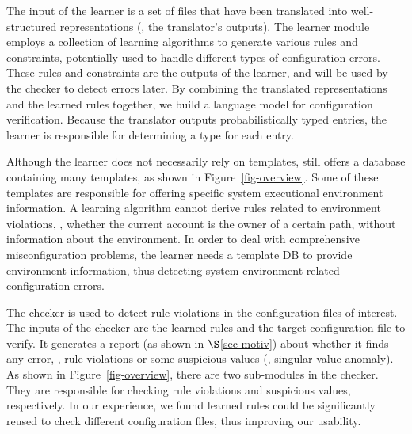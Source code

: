 The input of the learner is a set of files that have been translated
into well-structured representations (\ie, the translator's
outputs). The learner module employs a collection of learning algorithms
to generate various rules and constraints,
potentially used to handle different types of configuration errors.
These rules and constraints are the outputs of the learner, 
and will be used by the checker to detect errors later.
By combining the translated representations and the learned
rules together, we build a language model for
configuration verification.
Because the translator outputs probabilistically typed entries,
the learner is responsible for determining a type for each entry.


Although the learner does not necessarily rely on templates,
\app still offers a database containing many templates,
as shown in Figure~\ref{fig-overview}.
Some of these templates are responsible for offering
specific system executional environment information.
A learning algorithm cannot derive rules 
related to environment violations, \eg,
whether the current account is 
the owner of a certain path, without information 
about the environment. 
In order to deal with comprehensive misconfiguration problems,
the learner needs a template DB to provide environment information,
thus detecting system environment-related configuration errors.

The checker is used to detect rule violations in the configuration
files of interest. The inputs of the checker are the learned rules 
and the target configuration file to verify.
It generates a report (as shown in $\S$\ref{sec-motiv}) about 
whether it finds any error, \eg, rule violations 
or some suspicious values (\eg, singular value anomaly).
As shown in Figure~\ref{fig-overview},
there are two sub-modules in the checker. They are responsible for
checking rule violations and suspicious values, respectively.
In our experience, we found learned rules could be significantly reused
to check different configuration files, thus improving our usability.  
